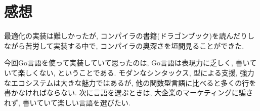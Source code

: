 \documentclass[a4j]{jarticle}
\begin{document}
\section{感想}
最適化の実装は難しかったが, コンパイラの書籍(ドラゴンブック)を読んだりしながら苦労して実装する中で, コンパイラの奥深さを垣間見ることができた.

今回Go言語を使って実装していて思ったのは, Go言語は表現力に乏しく, 書いていて楽しくない, ということである. モダンなシンタックス, 型による支援, 強力なエコシステムは大きな魅力ではあるが, 他の関数型言語に比べると多くの行を書かなければならない. 次に言語を選ぶときは, 大企業のマーケティングに騙されず, 書いていて楽しい言語を選びたい.
\end{document}
